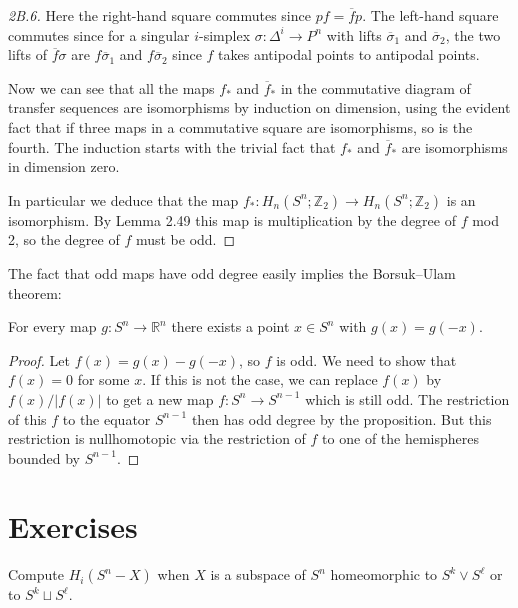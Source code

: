 \begin{proof}[2B.6]
Here the right-hand square commutes since $p f = \overline{f} p$. The left-hand square commutes since for a singular $i$-simplex $\sigma : \Delta^i \to P^n$ with lifts $\overline{\sigma}_1$ and $\overline{\sigma}_2$, the two lifts of $\overline{f} \sigma$ are $f \overline{\sigma}_1$ and $f \overline{\sigma}_2$ since $f$ takes antipodal points to antipodal points.

Now we can see that all the maps $f_*$ and $\overline{f}_*$ in the commutative diagram of transfer sequences are isomorphisms by induction on dimension, using the evident fact that if three maps in a commutative square are isomorphisms, so is the fourth. The induction starts with the trivial fact that $f_*$ and $\overline{f}_*$ are isomorphisms in dimension zero.

In particular we deduce that the map $f_*: H_n(S^n; \mathbb{Z}_2) \to H_n(S^n; \mathbb{Z}_2)$ is an isomorphism. By Lemma 2.49 this map is multiplication by the degree of $f$ mod 2, so the degree of $f$ must be odd.
\end{proof}
The fact that odd maps have odd degree easily implies the Borsuk--Ulam theorem:

\begin{corollary}
\label{cor:borsuk-ulam}
For every map $g : S^n \to \mathbb{R}^n$ there exists a point $x \in S^n$ with $g(x) = g(-x)$.
\end{corollary}
\begin{proof}
 Let $f(x) = g(x) - g(-x)$, so $f$ is odd. We need to show that $f(x) = 0$ for some $x$. If this is not the case, we can replace $f(x)$ by $f(x)/|f(x)|$ to get a new map $f : S^n \to S^{n-1}$ which is still odd. The restriction of this $f$ to the equator $S^{n-1}$ then has odd degree by the proposition. But this restriction is nullhomotopic via the restriction of $f$ to one of the hemispheres bounded by $S^{n-1}$.
\end{proof}
\section*{Exercises}

\begin{exercise}
Compute $H_i(S^n - X)$ when $X$ is a subspace of $S^n$ homeomorphic to $S^k \vee S^\ell$ or to $S^k \sqcup S^\ell$.
\end{exercise}

